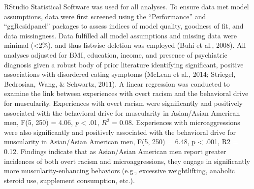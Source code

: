 \documentclass[
  english,
  man, fleqn, noextraspace,floatsintext]{apa6}
\begin{document}
RStudio Statistical Software was used for all analyses. To ensure data met model assumptions, data were first screened using the ``Performance'' and ``ggResidpanel'' packages to assess indices of model quality, goodness of fit, and data missingness. Data fulfilled all model assumptions and missing data were minimal (\textless2\%), and thus listwise deletion was employed (Buhi et al., 2008). All analyses adjusted for BMI, education, income, and presence of psychiatric diagnosis given a robust body of prior literature identifying significant, positive associations with disordered eating symptoms (McLean et al., 2014; Striegel, Bedrosian, Wang, \& Schwartz, 2011).
A linear regression was conducted to examine the link between experiences with overt racism and the behavioral drive for muscularity. Experiences with overt racism were significantly and positively associated with the behavioral drive for muscularity in Asian/Asian American men, F(5, 250) = 4.06, \emph{p} \textless{} .01, \(R^2\) = 0.08. Experiences with microaggressions were also significantly and positively associated with the behavioral drive for muscularity in Asian/Asian American men, F(5, 250) = 6.48, p \textless{} .001, R2 = 0.12. Findings indicate that as Asian/Asian American men report greater incidences of both overt racism and microaggressions, they engage in significantly more muscularity-enhancing behaviors (e.g., excessive weightlifting, anabolic steroid use, supplement consumption, etc.).
\end{document}
